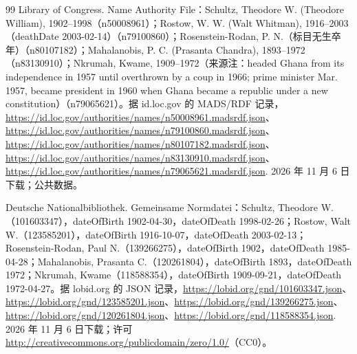 \begin{thebibliography}{99}
 Library of Congress. Name Authority File：Schultz, Theodore W. (Theodore William), 1902--1998（n50008961）；Rostow, W. W. (Walt Whitman), 1916--2003（deathDate 2003-02-14）（n79100860）；Rosenstein-Rodan, P. N.（标目无生卒年）（n80107182）；Mahalanobis, P. C. (Prasanta Chandra), 1893--1972（n83130910）；Nkrumah, Kwame, 1909--1972（来源注：headed Ghana from its independence in 1957 until overthrown by a coup in 1966; prime minister Mar. 1957, became president in 1960 when Ghana became a republic under a new constitution）（n79065621）。据 id.loc.gov 的 MADS/RDF 记录，\url{https://id.loc.gov/authorities/names/n50008961.madsrdf.json}、\url{https://id.loc.gov/authorities/names/n79100860.madsrdf.json}、\url{https://id.loc.gov/authorities/names/n80107182.madsrdf.json}、\url{https://id.loc.gov/authorities/names/n83130910.madsrdf.json}、\url{https://id.loc.gov/authorities/names/n79065621.madsrdf.json}. 2026 年 11 月 6 日下载；公共数据。

 Deutsche Nationalbibliothek. Gemeinsame Normdatei：Schultz, Theodore W.（101603347），dateOfBirth 1902-04-30，dateOfDeath 1998-02-26；Rostow, Walt W.（123585201），dateOfBirth 1916-10-07，dateOfDeath 2003-02-13；Rosenstein-Rodan, Paul N.（139266275），dateOfBirth 1902，dateOfDeath 1985-04-28；Mahalanobis, Prasanta C.（120261804），dateOfBirth 1893，dateOfDeath 1972；Nkrumah, Kwame（118588354），dateOfBirth 1909-09-21，dateOfDeath 1972-04-27。据 lobid.org 的 JSON 记录，\url{https://lobid.org/gnd/101603347.json}、\url{https://lobid.org/gnd/123585201.json}、\url{https://lobid.org/gnd/139266275.json}、\url{https://lobid.org/gnd/120261804.json}、\url{https://lobid.org/gnd/118588354.json}. 2026 年 11 月 6 日下载；许可 \url{http://creativecommons.org/publicdomain/zero/1.0/}（CC0）。


\end{thebibliography}
